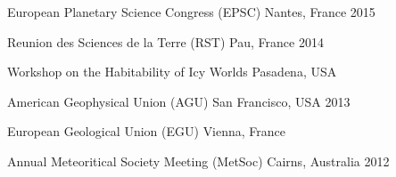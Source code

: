 \begin{cvhonors}
  \cvhonor
    {European Planetary Science Congress (EPSC)}
    {}
    {Nantes, France}
    {2015}

  \cvhonor
    {Reunion des Sciences de la Terre (RST)}
    {}
    {Pau, France}
    {2014}

  \cvhonor
    {Workshop on the Habitability of Icy Worlds}
    {}
    {Pasadena, USA}
    {}

  \cvhonor
    {American Geophysical Union (AGU)}
    {}
    {San Francisco, USA}
    {2013}

  \cvhonor
    {European Geological Union (EGU)}
    {}
    {Vienna, France}
    {}

  \cvhonor
    {Annual Meteoritical Society Meeting (MetSoc)}
    {}
    {Cairns, Australia}
    {2012}


\end{cvhonors}
